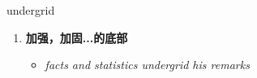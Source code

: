 
\begin{frame}
{\huge undergrid}
\begin{center}
\begin{enumerate}\Large
  \item \textbf{加强，加固...的底部}
  \begin{itemize}
    \item \em{\Large{facts and statistics undergrid his remarks}}
  \end{itemize}
\end{enumerate}
\end{center}
\end{frame}
